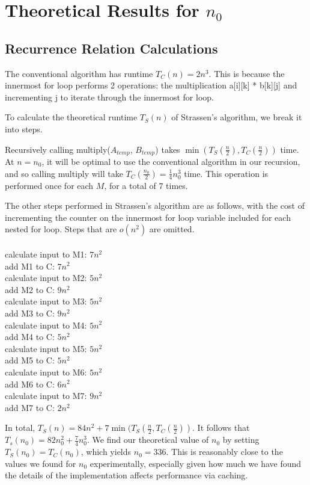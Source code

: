 \documentclass{article}
\begin{document}
\section*{Theoretical Results for $n_0$} 
\subsection*{Recurrence Relation Calculations}
The conventional algorithm has runtime $T_C (n) = 2 n^3$. This is because the innermost for loop performs 2 operations: the multiplication a[i][k] * b[k][j] and incrementing j to iterate through the innermost for loop. 

To calculate the theoretical runtime $T_S(n)$ of Strassen's algorithm, we break it into steps. 

Recursively calling multiply($A_{temp}$, $B_{temp}$) takes $\min(T_S(\frac{n}{2}), T_C(\frac{n}{2}))$ time. At $n=n_0$, it will be optimal to use the conventional algorithm in our recursion, and so calling multiply will take $T_C(\frac{n_0}{2}) = \frac{1}{4} n_0^3$ time. This operation is performed once for each $M$, for a total of 7 times. 

The other steps performed in Strassen's algorithm are as follows, with the cost of incrementing the counter on the innermost for loop variable included for each nested for loop. Steps that are $o(n^2)$ are omitted. \\\\
calculate input to M1: $7n^2$\\
add M1 to C: $7 n^2$\\
calculate input to M2: $5n^2$\\
add M2 to C: $9n^2$\\
calculate input to M3: $5n^2$\\
add M3 to C: $9 n^2$\\
calculate input to M4: $5n^2$\\
add M4 to C: $5n^2$\\
calculate input to M5: $5n^2$\\
add M5 to C: $5 n^2$\\
calculate input to M6: $5 n^2$\\
add M6 to C: $6 n^2$\\
calculate input to M7: $9 n^2$\\
add M7 to C: $2n^2$

In total, $T_S(n) = 84 n^2 + 7 \min(T_S(\frac{n}{2}, T_C(\frac{n}{2}))$. It follows that $T_s(n_0) = 82 n_0^2 + \frac{7}{4} n_0^3$. We find our theoretical value of $n_0$ by setting $T_S(n_0) = T_C (n_0)$, which yields $n_0 = 336$. This is reasonably close to the values we found for $n_0$ experimentally, especially given how much we have found the details of the implementation affects performance via caching. 
\end{document}
